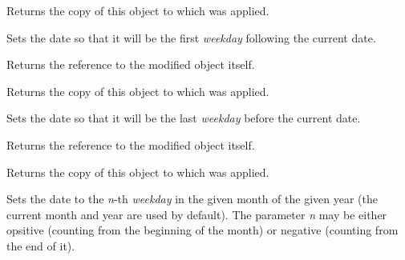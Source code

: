 \label{wxdatetimegetweekdayinsameweek}


Returns the copy of this object to which 
 was
applied.

\label{wxdatetimesettonextweekday}


Sets the date so that it will be the first {\it weekday} following the current
date.

Returns the reference to the modified object itself.

\label{wxdatetimegetnextweekday}


Returns the copy of this object to which 
 was applied.

\label{wxdatetimesettoprevweekday}


Sets the date so that it will be the last {\it weekday} before the current
date.

Returns the reference to the modified object itself.

\label{wxdatetimegetprevweekday}


Returns the copy of this object to which 
 was applied.

\label{wxdatetimesettoweekday}


Sets the date to the {\it n}-th {\it weekday} in the given month of the given
year (the current month and year are used by default). The parameter {\it n}
may be either opsitive (counting from the beginning of the month) or negative
(counting from the end of it).

